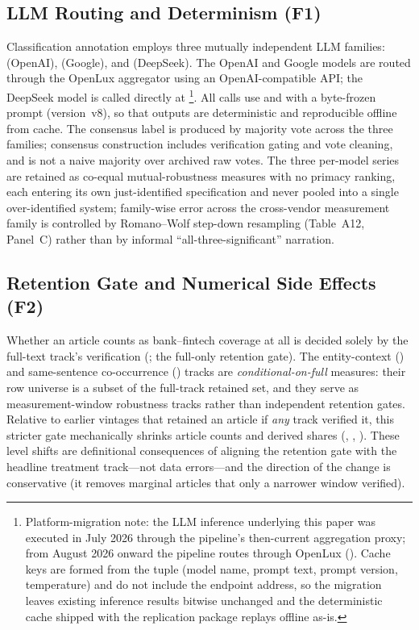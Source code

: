 \subsection{LLM Routing and Determinism (F1)}
Classification annotation employs three mutually independent LLM families:
 (OpenAI),  (Google), and
 (DeepSeek). The OpenAI and Google models are routed
through the OpenLux aggregator using an OpenAI-compatible API; the DeepSeek
model is called directly at \footnote{Platform-migration note: the LLM inference underlying this
paper was executed in July 2026 through the pipeline's then-current
aggregation proxy; from August 2026 onward the pipeline routes through
OpenLux (). Cache keys are formed from
the tuple (model name, prompt text, prompt version, temperature) and do
not include the endpoint address, so the migration leaves existing
inference results bitwise unchanged and the deterministic cache shipped
with the replication package replays offline as-is.}. All calls use
 and  with a byte-frozen prompt
(version~v8), so that outputs are deterministic and reproducible offline from
cache. The consensus label is produced by majority vote across the three
families; consensus construction includes verification gating and vote
cleaning, and is not a naive majority over archived raw votes. The three
per-model series are retained as co-equal mutual-robustness measures with no
primacy ranking, each entering its own just-identified specification and
never pooled into a single over-identified system; family-wise error across
the cross-vendor measurement family is controlled by Romano--Wolf step-down
resampling (Table~A12, Panel~C) rather than by informal
``all-three-significant'' narration.

\subsection{Retention Gate and Numerical Side Effects (F2)}
Whether an article counts as bank--fintech coverage at all is decided solely
by the full-text track's verification (; the
full-only retention gate). The entity-context () and same-sentence
co-occurrence () tracks are \emph{conditional-on-full} measures:
their row universe is a subset of the full-track retained set, and they serve
as measurement-window robustness tracks rather than independent retention
gates. Relative to earlier vintages that retained an article if \emph{any}
track verified it, this stricter gate mechanically shrinks article counts and
derived shares (, ,
). These level shifts are definitional consequences of
aligning the retention gate with the headline treatment track---not data
errors---and the direction of the change is conservative (it removes marginal
articles that only a narrower window verified).

